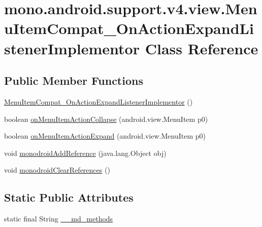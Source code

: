 \hypertarget{classmono_1_1android_1_1support_1_1v4_1_1view_1_1_menu_item_compat___on_action_expand_listener_implementor}{
\section{mono.android.support.v4.view.MenuItemCompat\_\-OnActionExpandListenerImplementor Class Reference}
\label{classmono_1_1android_1_1support_1_1v4_1_1view_1_1_menu_item_compat___on_action_expand_listener_implementor}
}
\subsection*{Public Member Functions}
\begin{CompactItemize}
\item 
\hyperlink{classmono_1_1android_1_1support_1_1v4_1_1view_1_1_menu_item_compat___on_action_expand_listener_implementor_ff91d893244e3503d0a115a5685055c7}{MenuItemCompat\_\-OnActionExpandListenerImplementor} ()
\item 
boolean \hyperlink{classmono_1_1android_1_1support_1_1v4_1_1view_1_1_menu_item_compat___on_action_expand_listener_implementor_9ea5677e5f21bf5c3aa69d8242db44aa}{onMenuItemActionCollapse} (android.view.MenuItem p0)
\item 
boolean \hyperlink{classmono_1_1android_1_1support_1_1v4_1_1view_1_1_menu_item_compat___on_action_expand_listener_implementor_dc73b3f61a71f2de8c3fe9e578c58463}{onMenuItemActionExpand} (android.view.MenuItem p0)
\item 
void \hyperlink{classmono_1_1android_1_1support_1_1v4_1_1view_1_1_menu_item_compat___on_action_expand_listener_implementor_e1594db9eea57bbf63d3077de01f3c24}{monodroidAddReference} (java.lang.Object obj)
\item 
void \hyperlink{classmono_1_1android_1_1support_1_1v4_1_1view_1_1_menu_item_compat___on_action_expand_listener_implementor_725ef56bb9745c14ea40b598752c24c3}{monodroidClearReferences} ()
\end{CompactItemize}
\subsection*{Static Public Attributes}
\begin{CompactItemize}
\item 
static final String \hyperlink{classmono_1_1android_1_1support_1_1v4_1_1view_1_1_menu_item_compat___on_action_expand_listener_implementor_784a531fa2fd045297a4b6c40ff359a1}{\_\-\_\-md\_\-methods}
\end{CompactItemize}
